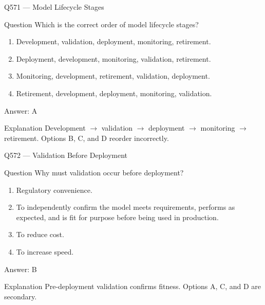 \documentclass[aspectratio=169,8pt]{beamer}
\begin{document}
	\begin{frame}{Q571 --- Model Lifecycle Stages}
		\begin{block}{Question}
			Which is the correct order of model lifecycle stages?
			\begin{enumerate}
				\item Development, validation, deployment, monitoring, retirement.
				\item Deployment, development, monitoring, validation, retirement.
				\item Monitoring, development, retirement, validation, deployment.
				\item Retirement, development, deployment, monitoring, validation.
			\end{enumerate}
		\end{block}
		\begin{exampleblock}{Answer: A}\end{exampleblock}
		\begin{block}{Explanation}
			Development $\to$ validation $\to$ deployment $\to$ monitoring $\to$ retirement. Options B, C, and D reorder incorrectly.
		\end{block}
	\end{frame}
	
	\begin{frame}{Q572 --- Validation Before Deployment}
		\begin{block}{Question}
			Why must validation occur before deployment?
			\begin{enumerate}
				\item Regulatory convenience.
				\item To independently confirm the model meets requirements, performs as expected, and is fit for purpose before being used in production.
				\item To reduce cost.
				\item To increase speed.
			\end{enumerate}
		\end{block}
		\begin{exampleblock}{Answer: B}\end{exampleblock}
		\begin{block}{Explanation}
			Pre-deployment validation confirms fitness. Options A, C, and D are secondary.
		\end{block}
	\end{frame}
	
\end{document}
